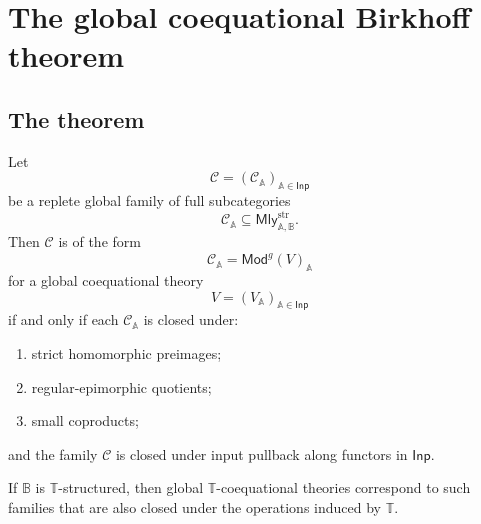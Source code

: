 \section{The global coequational Birkhoff theorem}
\label{sec:global-coequational-birkhoff}

\subsection{The theorem}
\label{subsec:global-coequational-birkhoff-theorem}

\begin{theorem}
\label{thm:global-coequational-birkhoff}
    Let
    \[
        \mathcal C=(\mathcal C_{\mathbb A})_{\mathbb A\in\mathsf{Inp}}
    \]
    be a replete global family of full subcategories
    \[
        \mathcal C_{\mathbb A}
        \subseteq
        \mathsf{Mly}^{\mathrm{str}}_{\mathbb A,\mathbb B}.
    \]
    Then \(\mathcal C\) is of the form
    \[
        \mathcal C_{\mathbb A}
        =
        \mathsf{Mod}^{g}(V)_{\mathbb A}
    \]
    for a global coequational theory
    \[
        V=(V_{\mathbb A})_{\mathbb A\in\mathsf{Inp}}
    \]
    if and only if each \(\mathcal C_{\mathbb A}\) is closed under:
    \begin{enumerate}
        \item strict homomorphic preimages;
        \item regular-epimorphic quotients;
        \item small coproducts;
    \end{enumerate}
    and the family \(\mathcal C\) is closed under input pullback along functors
    in \(\mathsf{Inp}\).

    If \(\mathbb B\) is \(\mathbb T\)-structured, then global
    \(\mathbb T\)-coequational theories correspond to such families that are
    also closed under the operations induced by \(\mathbb T\).
\end{theorem}

